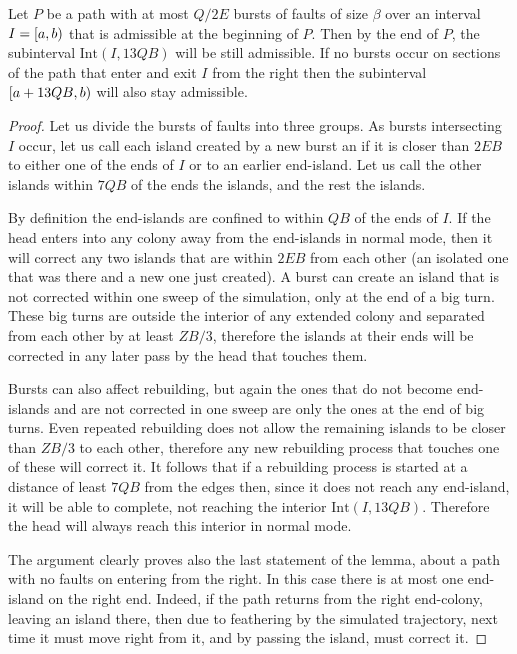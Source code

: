 \documentclass[11pt]{memoir}
\theoremstyle{definition} %
\def\B{B}
\newcommand{\E}{E} %
\newcommand{\Int}{\mathrm{Int}} %
\newcommand{\Q}{Q} %
\newcommand{\Z}{Z} %
\begin{document}
\begin{lemma}\label{lem:k-bursts}
  Let \( P \) be a path with at most \( \Q/2\E \) bursts of faults of size \( \beta \)
  over an interval \( I = \left[a,b\right) \) that is admissible at the beginning of \( P \).
  Then by the end of \( P \), the subinterval \( \Int(I, 13\Q\B) \) will be still admissible.
  If no bursts occur on sections of the path that enter and exit \( I \) from the right then
  the subinterval \( \lint{a+13\Q\B}{b} \) will also stay admissible.
\end{lemma}
\begin{proof}
  Let us divide the bursts of faults into three groups.
  As bursts intersecting \( I \) occur, let us call each island created by a new burst
  an  if it is closer than \( 2\E\B \) to either one of the ends of \( I \) or to
  an earlier end-island.
  Let us call the other islands within \( 7\Q\B \) of the ends the  islands, and the rest the
   islands.

  By definition the end-islands are confined to within \( \Q\B \) of the ends of \( I \).
  If the head enters into any colony away from the end-islands in normal mode,
  then it will correct any two islands that are within \( 2\E\B \) from each other (an isolated
  one that was there and a new one just created).
  A burst can create an island that is not corrected within one sweep of the simulation,
  only at the end of a big turn.
  These big turns are outside the interior of any extended colony and separated from each other
  by at least \( \Z\B/3 \), therefore the islands at their ends
  will be corrected in any later pass by the head that touches them.

  Bursts can also affect rebuilding, but again the ones that do not become end-islands and
  are not corrected in one sweep are only the ones at the end of big turns.
  Even repeated rebuilding does not allow the remaining islands to be closer than \( \Z\B/3 \) to
  each other, therefore any new rebuilding process that touches one of these will correct it.
  It follows that if a rebuilding process is started at a distance of least \( 7\Q\B \) from the edges
  then, since it does not reach any end-island, it will be able to complete, not reaching the interior
  \( \Int(I,13\Q\B) \).
  Therefore the head will always reach this interior in normal mode.

  The argument clearly proves also the last statement of the lemma,
  about a path with no faults on entering from the right.
  In this case there is at most one end-island on the right end.
  Indeed, if the path returns from the right end-colony, leaving an island there,
  then due to feathering by the simulated trajectory, next time it must move right from it,
  and by passing the island, must correct it.
  \end{proof}
\end{document}
